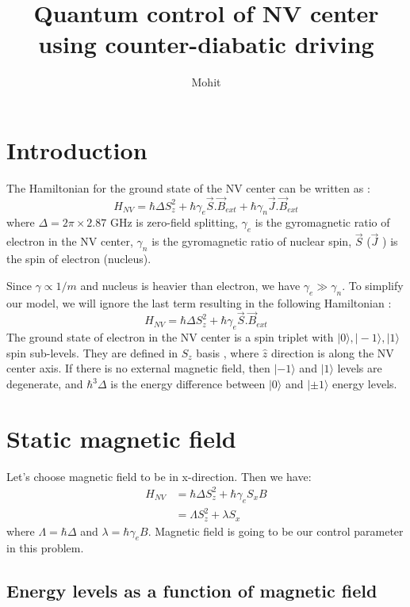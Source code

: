 \documentclass[11pt,a4paper]{article}
\author{Mohit}
\title{Quantum control of NV center using counter-diabatic driving  }
\begin{document}
\maketitle

\section{Introduction}
 The Hamiltonian for the ground state of the NV center can be written as :
\begin{equation}
H_{NV}= \hbar \Delta S_z^2 + \hbar \gamma_e \vec{S}. \vec{B}_{ext} +  \hbar \gamma_n \vec{J}. \vec{B}_{ext} 
\end{equation}
where $\Delta= 2 \pi \times 2.87 $ GHz is zero-field splitting, $\gamma_e$ is the gyromagnetic ratio of electron in the NV center, $\gamma_n$ is the gyromagnetic ratio of nuclear spin, $\vec{S}$ ($\vec{J}$ ) is the spin of electron (nucleus). 

Since $\gamma \propto 1/m$ and nucleus is heavier than electron, we have $\gamma_e \gg \gamma_n$. To simplify our model, we will ignore the last term resulting in the following Hamiltonian \cite{dhingra2017nitrogen}:
\begin{equation}
H_{NV}= \hbar \Delta S_z^2 + \hbar \gamma_e \vec{S}. \vec{B}_{ext} 
\end{equation}
The ground state of electron in the NV center is a spin triplet with $| 0 \rangle, | -1 \rangle, | 1 \rangle$ spin sub-levels. They are defined in $S_z$ basis , where $\hat{z}$ direction is along the NV center axis. If there is no external magnetic field, then $| -1 \rangle$ and $| 1 \rangle$ levels are degenerate, and  $ \hbar^3 \Delta$ is the energy difference between $| 0 \rangle$ and $| \pm 1 \rangle$ energy levels.

\section{Static magnetic field}

Let's choose magnetic field to be in x-direction. Then we have:
\begin{align*}
H_{NV} &= \hbar \Delta S_z^2 + \hbar \gamma_e   S_x  B \\
 &= \Lambda S_z^2 + \lambda   S_x  
\end{align*}
where $\Lambda= \hbar \Delta $ and $\lambda=\hbar \gamma_e B $. Magnetic field is going to be our control parameter in this problem. 

\subsection{Energy levels as a function of magnetic field}
\end{document}
